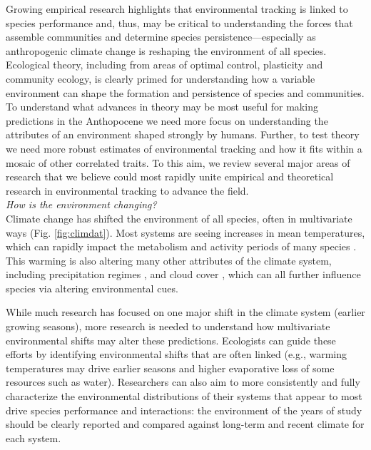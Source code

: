 \documentclass[11pt,letterpaper]{article}
\begin{document}
Growing empirical research highlights that environmental tracking is linked to species performance and, thus, may be critical to understanding the forces that assemble communities and determine species persistence---especially as anthropogenic climate change is reshaping the environment of all species. Ecological theory, including from areas of optimal control, plasticity and community ecology, is clearly primed for understanding how a variable environment can shape the formation and persistence of species and communities. To understand what advances in theory may be most useful for making predictions in the Anthopocene we need more focus on understanding the attributes of an environment shaped strongly by humans. Further, to test theory we need more robust estimates of environmental tracking and how it fits within a mosaic of other correlated traits. To this aim, we review several major areas of research that we believe could most rapidly unite empirical and theoretical research in environmental tracking to advance the field.\\ %

\emph{How is the environment changing?} \\ %
Climate change has shifted the environment of all species, often in multivariate ways (Fig. \ref{fig:climdat}). Most systems are seeing increases in mean temperatures, which can rapidly impact the metabolism and activity periods of many species \citep{Monson:2006vt,IPCC:2014sm}. This warming is also altering many other attributes of the climate system, including precipitation regimes \citep{Diffenbaugh2015}, and cloud cover \citep{hofer2017}, which can all further influence species via altering environmental cues. 

While much research has focused on one major shift in the climate system (earlier growing seasons), more research is needed to understand how multivariate environmental shifts may alter these predictions. Ecologists can guide these efforts by identifying environmental shifts that are often linked (e.g., warming temperatures may drive earlier seasons and higher evaporative loss of some resources such as water). Researchers can also aim to more consistently and fully characterize the environmental distributions of their systems that appear to most drive species performance and interactions: the environment of the years of study should be clearly reported and compared against long-term and recent climate for each system. 
\end{document}
